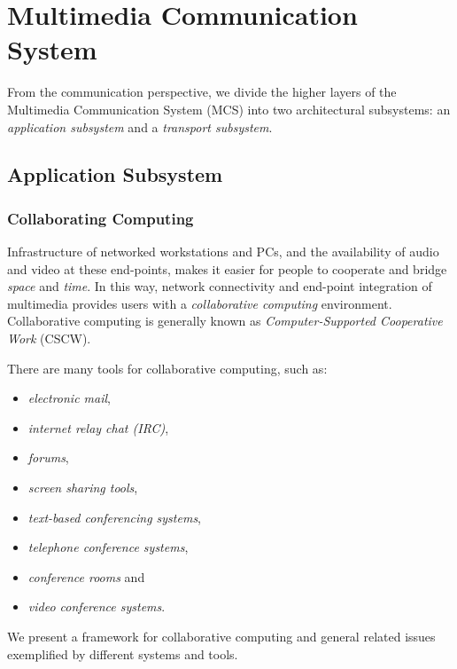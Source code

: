 



\section{Multimedia Communication System}
From the communication perspective, we divide the higher layers of the Multimedia Communication System (MCS) into two architectural subsystems: an \textit{application subsystem} and a \textit{transport subsystem}.

\subsection{Application Subsystem}
\subsubsection{Collaborating Computing}
Infrastructure of networked workstations and PCs, and the availability of audio and video at these end-points, makes it easier for people to cooperate and bridge \textit{space} and \textit{time}. In this way, network connectivity and end-point integration of multimedia provides users with a \textit{collaborative computing} environment. Collaborative computing is generally known as \textit{Computer-Supported Cooperative Work} (CSCW).
		
There are many tools for collaborative computing, such as:
\begin{multicols}{2}
	\begin{itemize}
		 \item \textit{electronic mail}, 
		 \item \textit{internet relay chat (IRC)}, 
		 \item \textit{forums},
		 \item \textit{screen sharing tools}, 
		 \item \textit{text-based conferencing systems}, 
		 \item \textit{telephone conference systems}, 
		 \item \textit{conference rooms} and 
		 \item \textit{video conference systems}.
	\end{itemize}
\end{multicols}


We present a framework for collaborative computing and general related issues exemplified by different systems and tools.	

